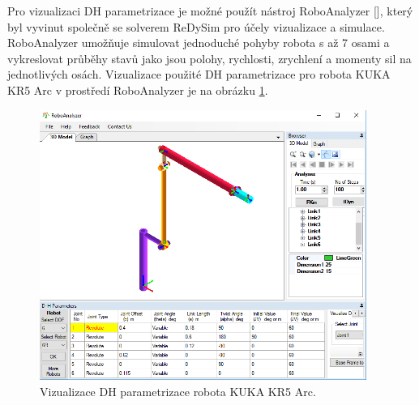 Pro vizualizaci DH parametrizace je možné použít nástroj RoboAnalyzer [\cite{roboanalyzer}], který byl vyvinut společně se solverem ReDySim pro účely vizualizace a simulace. RoboAnalyzer umožňuje simulovat jednoduché pohyby robota s až 7 osami a vykreslovat průběhy stavů jako jsou polohy, rychlosti, zrychlení a momenty sil na jednotlivých osách. Vizualizace použité DH parametrizace pro robota KUKA KR5 Arc v prostředí RoboAnalyzer je na obrázku \ref{dh_kuka_pic}.
\\
\begin{figure}[ht]
\includegraphics[width=0.95\textwidth]{pic_dh_kuka}
\caption{Vizualizace DH parametrizace robota KUKA KR5 Arc.}
\label{dh_kuka_pic}
\end{figure}

